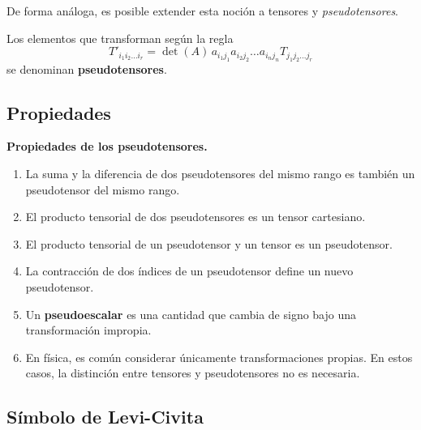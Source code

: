 De forma análoga, es posible extender esta noción a tensores y \emph{pseudotensores}.

\begin{defi} 
    Los elementos que transforman según la regla
    \begin{equation}
        T'_{i_1 i_2 \dots i_r} = \det(A) \, a_{i_1 j_1} a_{i_2 j_2} \dots a_{i_n j_n} T_{j_1 j_2 \dots j_r} 
    \end{equation}
    se denominan \textbf{pseudotensores}.
\end{defi}

\subsection{Propiedades}

\begin{propiedad}
    \textbf{Propiedades de los pseudotensores.}

    \begin{enumerate}
        \item La suma y la diferencia de dos pseudotensores del mismo rango es también un pseudotensor del mismo rango.
        \item El producto tensorial de dos pseudotensores es un tensor cartesiano.
        \item El producto tensorial de un pseudotensor y un tensor es un pseudotensor.
        \item La contracción de dos índices de un pseudotensor define un nuevo pseudotensor.
        \item Un \textbf{pseudoescalar} es una cantidad que cambia de signo bajo una transformación impropia.
        \item En física, es común considerar únicamente transformaciones propias. En estos casos, la distinción entre tensores y pseudotensores no es necesaria.
    \end{enumerate}
\end{propiedad}

\subsection{Símbolo de Levi-Civita}

